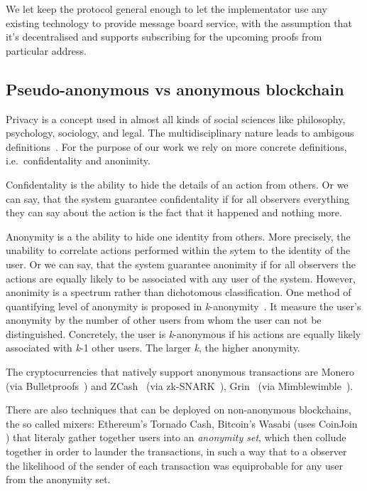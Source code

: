 \documentclass{ieeeaccess}
\begin{document}
We let keep the protocol general enough to let the implementator use any
existing technology to provide message board service, with the
assumption that it's decentralised and supports subscribing for the
upcoming proofs from particular address.



\subsection{Pseudo-anonymous vs anonymous blockchain}
Privacy is a concept used in almost all kinds of social sciences like
philosophy, psychology, sociology, and legal. The multidisciplinary
nature leads to ambigous definitions~\cite{smith2011information}. For
the purpose of our work we rely on more concrete definitions,
i.e.~confidentality and anonimity.

Confidentality is the ability to hide the details of an action from
others. Or we can say, that the system guarantee confidentality if for
all observers everything they can say about the action is the fact that
it happened and nothing more.

Anonymity is a the ability to hide one identity from others. More
precisely, the unability to correlate actions performed within the sytem
to the identity of the user. Or we can say, that the system guarantee
anonimity if for all observers the actions are equally likely to be
associated with any user of the system. However, anonimity is a spectrum
rather than dichotomous classification. One method of quantifying level
of anonymity is proposed in \textit{k}-anonymity~\cite{sweeney2002k}. It measure
the user's anonymity by the number of other users from whom the user can
not be distinguished. Concretely, the user is \textit{k}-anonymous if his
actions are equally likely associated with \textit{k}-1 other users. The
larger \textit{k}, the higher anonymity.

The cryptocurrencies that natively support anonymous transactions are
Monero~\cite{van2013cryptonote} (via Bulletproofs~\cite{Bulletpr14, bunz2018bulletproofs}) and ZCash~\cite{sasson2014zerocash} (via zk-SNARK~\cite{ben2013snarks}), Grin~\cite{fuchsbauer2019aggregate} (via Mimblewimble~\cite{httpsdow19}).

There are also techniques that can be deployed on non-anonymous
blockchains, the so called mixers: Ethereum's Tornado
Cash\cite{pertsev2019tornado}, Bitcoin's Wasabi\cite{WasabiWa56} (uses
CoinJoin \cite{CoinJoin41}) that literaly gather together users into an
\textit{anonymity set}, which then collude together in order to launder the
transactions, in such a way that to a observer the likelihood of the
sender of each transaction was equiprobable for any user from the
anonymity set.
\end{document}
